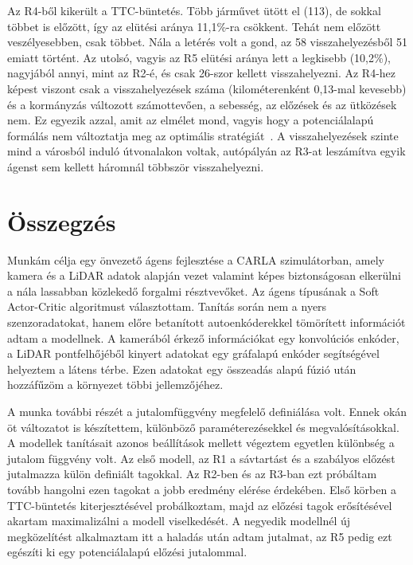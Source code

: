 \documentclass[a4paper,12pt,oneside]{article}
\begin{document}
Az R4-ből kikerült a TTC-büntetés. Több járművet ütött el (113), de sokkal többet is
előzött, így az elütési aránya 11,1\%-ra csökkent. Tehát nem előzött veszélyesebben,
csak többet. Nála a letérés volt a gond, az 58 visszahelyezésből 51 emiatt történt. Az
utolsó, vagyis az R5 elütési aránya lett a legkisebb (10,2\%), nagyjából annyi, mint az
R2-é, és csak 26-szor kellett visszahelyezni. Az R4-hez képest viszont csak a
visszahelyezések száma (kilométerenként 0,13-mal kevesebb) és a kormányzás változott
számottevően, a sebesség, az előzések és az ütközések nem. Ez egyezik azzal, amit az
elmélet mond, vagyis hogy a potenciálalapú formálás nem változtatja meg az optimális
stratégiát~\cite{ng1999}. A visszahelyezések szinte mind a városból induló útvonalakon
voltak, autópályán az R3-at leszámítva egyik ágenst sem kellett háromnál többször
visszahelyezni.


\section{Összegzés}

Munkám célja egy önvezető ágens fejlesztése a CARLA szimulátorban, amely kamera
és a LiDAR adatok alapján vezet valamint képes 
biztonságosan elkerülni a nála lassabban közlekedő forgalmi résztvevőket. 
Az ágens típusának a Soft Actor-Critic algoritmust választottam. 
Tanítás során nem a nyers szenzoradatokat, hanem előre betanított autoenkóderekkel tömörített
információt adtam a modellnek. A kamerából érkező információkat egy
konvolúciós enkóder, a LiDAR pontfelhőjéből kinyert adatokat egy gráfalapú 
enkóder segítségével helyeztem a látens térbe. Ezen adatokat egy összeadás alapú 
fúzió után hozzáfűzöm a környezet többi jellemzőjéhez.

A munka további részét a jutalomfüggvény megfelelő definiálása volt. Ennek okán öt változatot is 
készítettem, különböző paraméterezésekkel és megvalósításokkal. A modellek tanításait azonos 
beállítások mellett végeztem egyetlen különbség a jutalom függvény volt. 
Az első modell, az R1 a sávtartást és a szabályos előzést jutalmazza külön definiált tagokkal. 
Az R2-ben és az R3-ban ezt próbáltam tovább hangolni ezen tagokat a jobb eredmény elérése 
érdekében. Első körben a TTC-büntetés kiterjesztésével probálkoztam, majd az előzési tagok erősítésével
akartam maximalizálni a modell viselkedését. 
A negyedik modellnél új megközelítést alkalmaztam itt a haladás után adtam jutalmat, az R5 pedig ezt egészíti
ki egy potenciálalapú előzési jutalommal.
\end{document}
